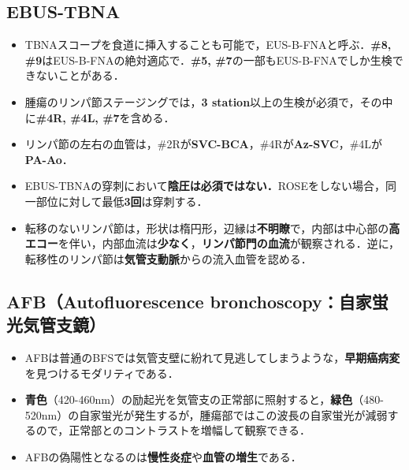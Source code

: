 \subsection{EBUS-TBNA}
\begin{itemize}
\item TBNAスコープを食道に挿入することも可能で，EUS-B-FNAと呼ぶ．\textbf{\#8, \#9}はEUS-B-FNAの絶対適応で．\textbf{\#5, \#7}の一部もEUS-B-FNAでしか生検できないことがある．
\item 腫瘍のリンパ節ステージングでは，\textbf{3 station}以上の生検が必須で，その中に\textbf{\#4R, \#4L, \#7}を含める．
\item リンパ節の左右の血管は，\#2Rが\textbf{SVC-BCA}，\#4Rが\textbf{Az-SVC}，\#4Lが\textbf{PA-Ao}．
\item EBUS-TBNAの穿刺において\textbf{陰圧は必須ではない．}ROSEをしない場合，同一部位に対して最低\textbf{3回}は穿刺する．
\item 転移のないリンパ節は，形状は楕円形，辺縁は\textbf{不明瞭}で，内部は中心部の\textbf{高エコー}を伴い，内部血流は\textbf{少なく}，\textbf{リンパ節門の血流}が観察される．逆に，転移性のリンパ節は\textbf{気管支動脈}からの流入血管を認める．
\end{itemize}

\subsection{AFB（Autofluorescence bronchoscopy：自家蛍光気管支鏡）}

\begin{itemize}

\item AFBは普通のBFSでは気管支壁に紛れて見逃してしまうような，\textbf{早期癌病変}を見つけるモダリティである．

\item \textbf{青色}（420-460nm）の励起光を気管支の正常部に照射すると，\textbf{緑色}（480-520nm）の自家蛍光が発生するが，腫瘍部ではこの波長の自家蛍光が減弱するので，正常部とのコントラストを増幅して観察できる．
\item AFBの偽陽性となるのは\textbf{慢性炎症}や\textbf{血管の増生}である．
\end{itemize}

